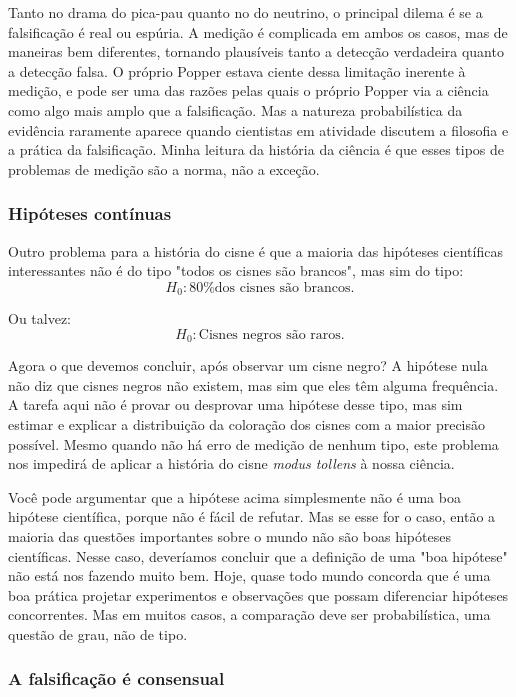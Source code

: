 Tanto no drama do pica-pau quanto no do neutrino, o principal dilema é se a falsificação é real ou espúria. A medição é complicada em ambos os casos, mas de maneiras bem diferentes, tornando plausíveis tanto a detecção verdadeira quanto a detecção falsa. O próprio Popper estava ciente dessa limitação inerente à medição, e pode ser uma das razões pelas quais o próprio Popper via a ciência como algo mais amplo que a falsificação. Mas a natureza probabilística da evidência raramente aparece quando cientistas em atividade discutem a filosofia e a prática da falsificação. Minha leitura da história da ciência é que esses tipos de problemas de medição são a norma, não a exceção.

\subsubsection{Hipóteses contínuas}

Outro problema para a história do cisne é que a maioria das hipóteses científicas interessantes não é do tipo "todos os cisnes são brancos", mas sim do tipo:
$$H_0: \text{80\% dos cisnes são brancos.}$$

Ou talvez:
$$H_0: \text{Cisnes negros são raros.}$$

Agora o que devemos concluir, após observar um cisne negro? A hipótese nula não diz que cisnes negros não existem, mas sim que eles têm alguma frequência. A tarefa aqui não é provar ou desprovar uma hipótese desse tipo, mas sim estimar e explicar a distribuição da coloração dos cisnes com a maior precisão possível. Mesmo quando não há erro de medição de nenhum tipo, este problema nos impedirá de aplicar a história do cisne \textit{modus tollens} à nossa ciência.

Você pode argumentar que a hipótese acima simplesmente não é uma boa hipótese científica, porque não é fácil de refutar. Mas se esse for o caso, então a maioria das questões importantes sobre o mundo não são boas hipóteses científicas. Nesse caso, deveríamos concluir que a definição de uma "boa hipótese" não está nos fazendo muito bem. Hoje, quase todo mundo concorda que é uma boa prática projetar experimentos e observações que possam diferenciar hipóteses concorrentes. Mas em muitos casos, a comparação deve ser probabilística, uma questão de grau, não de tipo.

\subsubsection{A falsificação é consensual}

